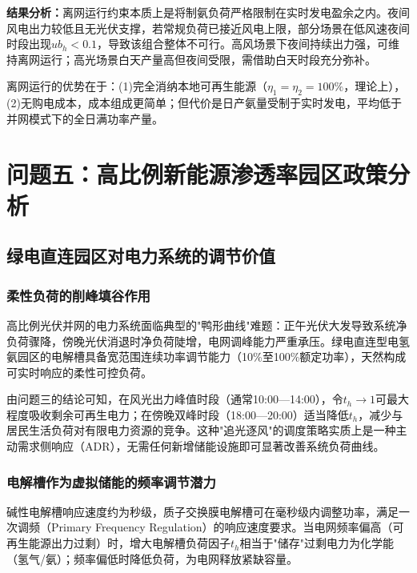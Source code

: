 \documentclass[UTF8,12pt,a4paper]{ctexart}
\begin{document}
\noindent\textbf{结果分析：}离网运行约束本质上是将制氨负荷严格限制在实时发电盈余之内。夜间风电出力较低且无光伏支撑，若常规负荷已接近风电上限，部分场景在低风速夜间时段出现$ub_h<0.1$，导致该组合整体不可行。高风场景下夜间持续出力强，可维持离网运行；高光场景白天产量高但夜间受限，需借助白天时段充分弥补。

离网运行的优势在于：(1)完全消纳本地可再生能源（$\eta_1=\eta_2=100\%$，理论上），(2)无购电成本，成本组成更简单；但代价是日产氨量受制于实时发电，平均低于并网模式下的全日满功率产量。

\section{问题五：高比例新能源渗透率园区政策分析}

\subsection{绿电直连园区对电力系统的调节价值}

\subsubsection{柔性负荷的削峰填谷作用}

高比例光伏并网的电力系统面临典型的"鸭形曲线"难题：正午光伏大发导致系统净负荷骤降，傍晚光伏消退时净负荷陡增，电网调峰能力严重承压。绿电直连型电氢氨园区的电解槽具备宽范围连续功率调节能力（10\%至100\%额定功率），天然构成可实时响应的柔性可控负荷。

由问题三的结论可知，在风光出力峰值时段（通常10:00—14:00），令$t_h\to1$可最大程度吸收剩余可再生电力；在傍晚双峰时段（18:00—20:00）适当降低$t_h$，减少与居民生活负荷对有限电力资源的竞争。这种"追光逐风"的调度策略实质上是一种主动需求侧响应（ADR），无需任何新增储能设施即可显著改善系统负荷曲线。

\subsubsection{电解槽作为虚拟储能的频率调节潜力}

碱性电解槽响应速度约为秒级，质子交换膜电解槽可在毫秒级内调整功率，满足一次调频（Primary Frequency Regulation）的响应速度要求。当电网频率偏高（可再生能源出力过剩）时，增大电解槽负荷因子$t_h$相当于"储存"过剩电力为化学能（氢气/氨）；频率偏低时降低负荷，为电网释放紧缺容量。
\end{document}
